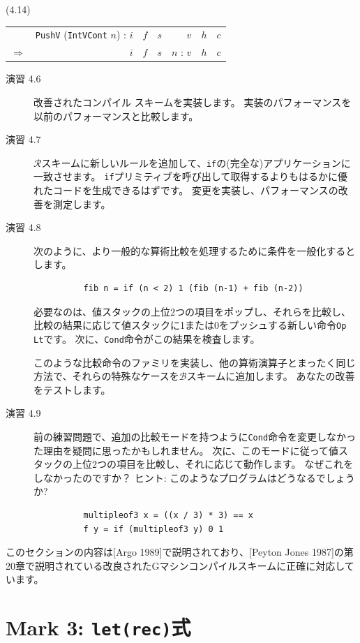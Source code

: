\documentclass{jbook}
\begin{document}
(4.14) \\
\begin{tabular} {|l r l r r l l|} \hline
	                  & \texttt{PushV} (\texttt{IntVCont} $n$) : $i$ & $f$ & $s$ & $v$       & $h$ & $c$ \\
	$\Longrightarrow$ & $i$                                          & $f$ & $s$ & $n$ : $v$ & $h$ & $c$ \\ \hline
\end{tabular}

\begin{description}
	\item[演習 4.6] 改善されたコンパイル スキームを実装します。
		実装のパフォーマンスを以前のパフォーマンスと比較します。
	\item[演習 4.7] $\mathcal{R}$スキームに新しいルールを追加して、\texttt{if}の(完全な)アプリケーションに一致させます。
		\texttt{if}プリミティブを呼び出して取得するよりもはるかに優れたコードを生成できるはずです。
		変更を実装し、パフォーマンスの改善を測定します。
	\item[演習 4.8] 次のように、より一般的な算術比較を処理するために条件を一般化するとします。
		\begin{verbatim}
          fib n = if (n < 2) 1 (fib (n-1) + fib (n-2))
        \end{verbatim}
		必要なのは、値スタックの上位2つの項目をポップし、それらを比較し、比較の結果に応じて値スタックに1または0をプッシュする新しい命令\texttt{Op Lt}です。
		次に、\texttt{Cond}命令がこの結果を検査します。

		このような比較命令のファミリを実装し、他の算術演算子とまったく同じ方法で、それらの特殊なケースを$\mathcal{B}$スキームに追加します。
		あなたの改善をテストします。
	\item[演習 4.9] 前の練習問題で、追加の比較モードを持つように\texttt{Cond}命令を変更しなかった理由を疑問に思ったかもしれません。
		次に、このモードに従って値スタックの上位2つの項目を比較し、それに応じて動作します。
		なぜこれをしなかったのですか？
		ヒント: このようなプログラムはどうなるでしょうか?
		\begin{verbatim}
          multipleof3 x = ((x / 3) * 3) == x
          f y = if (multipleof3 y) 0 1
        \end{verbatim}
\end{description}
このセクションの内容は[Argo 1989]で説明されており、[Peyton Jones 1987]の第20章で説明されている改良されたGマシンコンパイルスキームに正確に対応しています。
\newpage

\section{Mark 3: \texttt{let(rec)}式}
\end{document}
